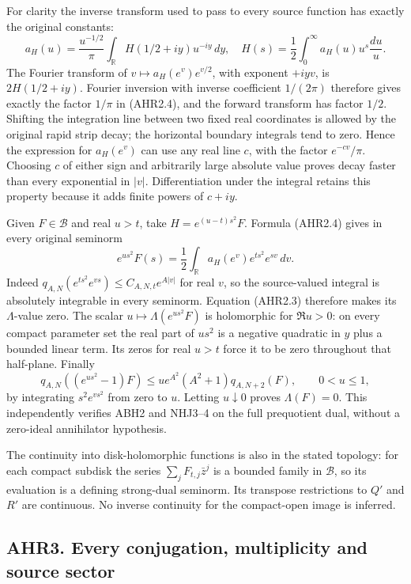 For clarity the inverse transform used to pass to every source function
has exactly the original constants: \[
a_H(u)=\frac{u^{-1/2}}\pi\int_{\mathbb R}H(1/2+iy)u^{-iy}\,dy,
\quad H(s)=\frac12\int_0^\infty a_H(u)u^s\frac{du}{u}.
\tag{AHR2.4}
\] The Fourier transform of \(v\mapsto a_H(e^v)e^{v/2}\), with exponent
\(+iyv\), is \(2H(1/2+iy)\). Fourier inversion with inverse coefficient
\(1/(2\pi)\) therefore gives exactly the factor \(1/\pi\) in (AHR2.4),
and the forward transform has factor \(1/2\). Shifting the integration
line between two fixed real coordinates is allowed by the original rapid
strip decay; the horizontal boundary integrals tend to zero. Hence the
expression for \(a_H(e^v)\) can use any real line \(c\), with the factor
\(e^{-cv}/\pi\). Choosing \(c\) of either sign and arbitrarily large
absolute value proves decay faster than every exponential in \(|v|\).
Differentiation under the integral retains this property because it adds
finite powers of \(c+iy\).

Given \(F\in\mathcal B\) and real \(u>t\), take \(H=e^{(u-t)s^2}F\).
Formula (AHR2.4) gives in every original seminorm \[
e^{us^2}F(s)=\frac12\int_{\mathbb R}a_H(e^v)e^{ts^2}e^{sv}\,dv.
\tag{AHR2.5}
\] Indeed \(q_{A,N}(e^{ts^2}e^{vs})\le C_{A,N,t}e^{A|v|}\) for real
\(v\), so the source-valued integral is absolutely integrable in every
seminorm. Equation (AHR2.3) therefore makes its \(\Lambda\)-value zero.
The scalar \(u\mapsto\Lambda(e^{us^2}F)\) is holomorphic for
\(\Re u>0\): on every compact parameter set the real part of \(us^2\) is
a negative quadratic in \(y\) plus a bounded linear term. Its zeros for
real \(u>t\) force it to be zero throughout that half-plane. Finally \[
q_{A,N}((e^{us^2}-1)F)
\le u e^{A^2}(A^2+1)q_{A,N+2}(F),\qquad 0<u\le1,
\] by integrating \(s^2e^{vs^2}\) from zero to \(u\). Letting
\(u\downarrow0\) proves \(\Lambda(F)=0\). This independently verifies
ABH2 and NHJ3--4 on the full prequotient dual, without a zero-ideal
annihilator hypothesis.

The continuity into disk-holomorphic functions is also in the stated
topology: for each compact subdisk the series \(\sum_jF_{t,j}\bar z^j\)
is a bounded family in \(\mathcal B\), so its evaluation is a defining
strong-dual seminorm. Its transpose restrictions to \(Q'\) and \(R'\)
are continuous. No inverse continuity for the compact-open image is
inferred.

\subsection{AHR3. Every conjugation, multiplicity and source
sector}\label{ahr3.-every-conjugation-multiplicity-and-source-sector}

